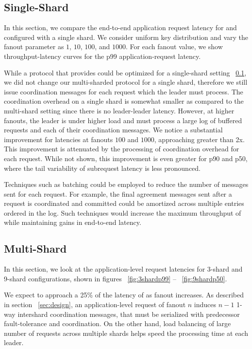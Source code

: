 \subsection{Single-Shard}
In this section, we compare the end-to-end application request latency for \system and \mpaxos configured with a single shard. We consider uniform key distribution and vary the fanout parameter as $1$, $10$, $100$, and $1000$. For each fanout value, we show throughput-latency curves for the p99 application-request latency.

While a protocol that provides \mdl could be optimized for a single-shard setting ~\ref{}, we did not change our multi-sharded protocol for a single shard, therefore we still issue coordination messages for each request which the leader must process. The coordination overhead on a single shard is somewhat smaller as compared to the multi-shard setting since there is no leader-leader latency. However, at higher fanouts, the leader is under higher load and must process a large log of buffered requests and each of their coordination messages. We notice a substantial improvement for latencies at fanouts $100$ and $1000$, approaching greater than 2x. This improvement is attenuated by the processing of coordination overhead for each request. While not shown, this improvement is even greater for p90 and p50, where the tail variability of subrequest latency is less pronounced.

Techniques such as batching could be employed to reduce the number of messages sent for each request. For example, the final agreement messages sent after a request is coordinated and committed could be amortized across multiple entries ordered in the log. Such techniques would increase the maximum throughput of \protocol while maintaining gains in end-to-end latency.

\subsection{Multi-Shard}
\label{sec:shards}
In this section, we look at the application-level request latencies for 3-shard and 9-shard configurations, shown in figures ~\ref{fig:3shardp99} -- ~\ref{fig:9shardp50}.

We expect \system to approach a 25\% of the latency of \mpaxos as fanout increases.
As described in section ~\ref{sec:design}, an application-level request of fanout $n$ induces $n-1$ 1-way intershard coordination messages, that must be serialized with predecessor fault-tolerance and coordination. On the other hand, load balancing of large number of requests across multiple shards helps speed the processing time at each leader.

